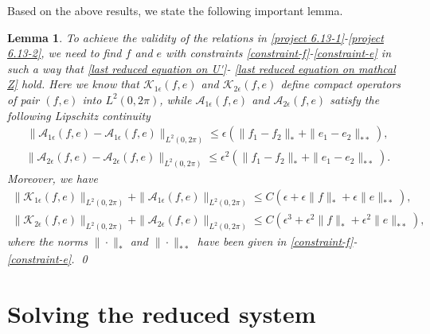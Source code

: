 \documentclass[10pt, reqno]{amsart}
\numberwithin{equation}{section}
\newtheorem{lemma}[theorem]{Lemma}
\theoremstyle{definition}
\begin{document}
{ \medskip
Based on the above results, we state the following important lemma.
\begin{lemma} \label{Lemma7-2}
To achieve the validity of the relations in \eqref{project 6.13-1}-\eqref{project 6.13-2}, we need to find $f$ and $e$ with constraints \eqref{constraint-f}-\eqref{constraint-e} in such a way that \eqref{last reduced equation on U'}- \eqref{last reduced equation on mathcal Z} hold.
Here we know that
 $\mathcal K_{1\epsilon} (f, e)$ and $\mathcal K_{2\epsilon} (f, e)$ define compact operators of pair $(f,e)$ into $L^2(0, 2\pi)$, while $\mathcal A_{1\epsilon} (f, e)$ and $\mathcal A_{2\epsilon} (f, e)$
 satisfy the following Lipschitz continuity
\begin{align*}
 \| \mathcal A_{1\epsilon} (f, e) - \mathcal A_{1\epsilon} (f, e) \|_{L^2(0, 2\pi)} \le \epsilon (\|f_1- f_2\|_* + \|e_1- e_2\|_{**} ),
\end{align*}
\begin{align*}
 \| \mathcal A_{2\epsilon} (f, e) - \mathcal A_{2\epsilon} (f, e) \|_{L^2(0, 2\pi)} \le \epsilon^2 (\|f_1- f_2\|_* + \|e_1- e_2\|_{**} ).
\end{align*}
 Moreover, we have
\begin{align*}
 \|\mathcal K_{1 \epsilon} (f, e) \|_{L^2(0, 2\pi)} + \|\mathcal A_{1 \epsilon} (f, e) \|_{L^2(0, 2\pi)} \le C \left(\epsilon + \epsilon \|f\|_* + \epsilon \|e\|_{**} \right),
\end{align*}
\begin{align*}
 \|\mathcal K_{2 \epsilon} (f, e) \|_{L^2(0, 2\pi)} + \|\mathcal A_{2 \epsilon} (f, e) \|_{L^2(0, 2\pi)} \le C \left(\epsilon^3 + \epsilon^2 \|f\|_* + \epsilon^2 \|e\|_{**} \right),
\end{align*}
where the norms $\|\cdot\|_*$ and $ \|\cdot\|_{**}$ have been given in \eqref{constraint-f}-\eqref{constraint-e}.
\qed
\end{lemma}
















\medskip
\section{Solving the reduced system} \label{Section8}




}
\end{document}
